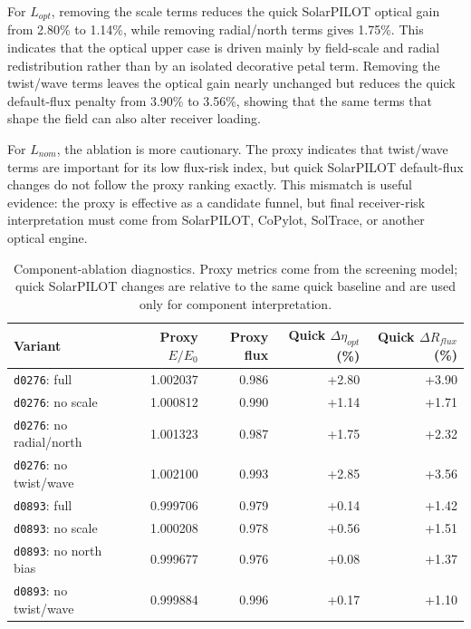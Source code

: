 \documentclass[final,3p,times]{elsarticle}
\begin{document}
For $L_{opt}$, removing the scale terms reduces the quick SolarPILOT optical gain from 2.80\% to 1.14\%, while removing radial/north terms gives 1.75\%. This indicates that the optical upper case is driven mainly by field-scale and radial redistribution rather than by an isolated decorative petal term. Removing the twist/wave terms leaves the optical gain nearly unchanged but reduces the quick default-flux penalty from 3.90\% to 3.56\%, showing that the same terms that shape the field can also alter receiver loading.

For $L_{nom}$, the ablation is more cautionary. The proxy indicates that twist/wave terms are important for its low flux-risk index, but quick SolarPILOT default-flux changes do not follow the proxy ranking exactly. This mismatch is useful evidence: the proxy is effective as a candidate funnel, but final receiver-risk interpretation must come from SolarPILOT, CoPylot, SolTrace, or another optical engine.

\begin{table}[t]
\centering
\caption{Component-ablation diagnostics. Proxy metrics come from the screening model; quick SolarPILOT changes are relative to the same quick baseline and are used only for component interpretation.}
\label{tab:ablation}
\scriptsize
\begin{tabular*}{\textwidth}{@{\extracolsep{\fill}}lrrrr@{}}
\toprule
Variant & Proxy $E/E_0$ & Proxy flux & Quick $\Delta\eta_{opt}$ (\%) & Quick $\Delta R_{flux}$ (\%) \\
\midrule
\texttt{d0276}: full & 1.002037 & 0.986 & +2.80 & +3.90 \\
\texttt{d0276}: no scale & 1.000812 & 0.990 & +1.14 & +1.71 \\
\texttt{d0276}: no radial/north & 1.001323 & 0.987 & +1.75 & +2.32 \\
\texttt{d0276}: no twist/wave & 1.002100 & 0.993 & +2.85 & +3.56 \\
\texttt{d0893}: full & 0.999706 & 0.979 & +0.14 & +1.42 \\
\texttt{d0893}: no scale & 1.000208 & 0.978 & +0.56 & +1.51 \\
\texttt{d0893}: no north bias & 0.999677 & 0.976 & +0.08 & +1.37 \\
\texttt{d0893}: no twist/wave & 0.999884 & 0.996 & +0.17 & +1.10 \\
\bottomrule
\end{tabular*}
\end{table}
\end{document}

